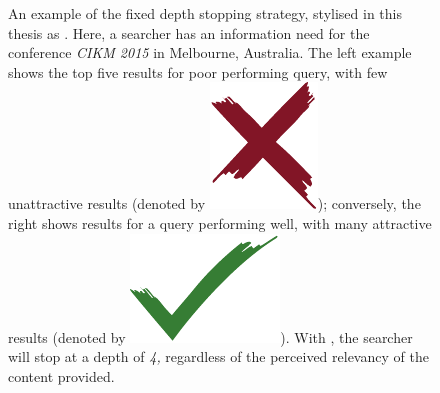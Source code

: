 \begin{figure}[t!]
    \centering
    \caption[Examples of the fixed depth stopping strategy, ]{An example of the fixed depth stopping strategy, stylised in this thesis as . Here, a searcher has an information need for the conference \emph{CIKM 2015} in Melbourne, Australia. The left example shows the top five results for poor performing query, with few unattractive results (denoted by {\includegraphics[height=\fontcharht\font`\d]{figures/ch0-cross.pdf}}); conversely, the right shows results for a query performing well, with many attractive results (denoted by {\includegraphics[height=\fontcharht\font`\d]{figures/ch0-tick.pdf}}). With , the searcher will stop at a depth of \emph{4,} regardless of the perceived relevancy of the content provided.}
    \label{fig:ss1}
\end{figure}

